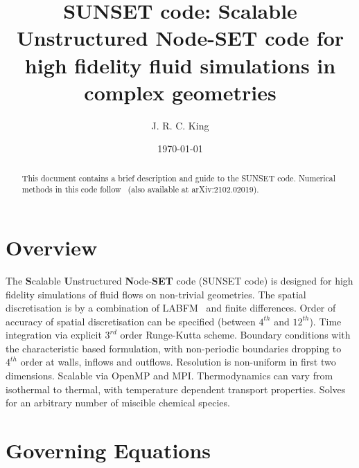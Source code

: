 \documentclass[notitlepage]{revtex4-1}
\begin{document}
\title{SUNSET code: Scalable Unstructured Node-SET code for high fidelity fluid simulations in complex geometries}

\author{J. R. C. King}
\date{\today}
\begin{abstract}

This document contains a brief description and guide to the SUNSET code. Numerical methods in this code follow~\cite{king_labfm_2022} (also available at arXiv:2102.02019).

\end{abstract}

\maketitle

\section{Overview}

The \textbf{S}calable \textbf{U}nstructured \textbf{N}ode-\textbf{SET} code (SUNSET code) is designed for high fidelity simulations of fluid flows on non-trivial geometries. The spatial discretisation is by a combination of LABFM~\cite{king_labfm_2021,king_labfm_2022} and finite differences. Order of accuracy of spatial discretisation can be specified (between $4^{th}$ and $12^{th}$). Time integration via explicit $3^{rd}$ order Runge-Kutta scheme. Boundary conditions with the characteristic based formulation, with non-periodic boundaries dropping to $4^{th}$ order at walls, inflows and outflows. Resolution is non-uniform in first two dimensions. Scalable via OpenMP and MPI. Thermodynamics can vary from isothermal to thermal, with temperature dependent transport properties. Solves for an arbitrary number of miscible chemical species.


\section{Governing Equations}\label{ge}
\end{document}
